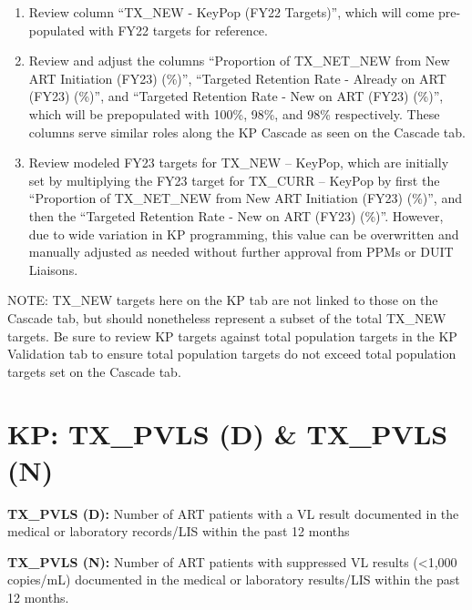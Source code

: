 \documentclass[
  openany]{book}
\begin{document}
\begin{enumerate}
\def\labelenumi{\arabic{enumi}.}
\item
  Review column ``TX\_NEW - KeyPop (FY22 Targets)'', which will come
  pre-populated with FY22 targets for reference.
\item
  Review and adjust the columns ``Proportion of TX\_NET\_NEW from New ART
  Initiation (FY23) (\%)'', ``Targeted Retention Rate - Already on ART
  (FY23) (\%)'', and ``Targeted Retention Rate - New on ART (FY23) (\%)'',
  which will be prepopulated with 100\%, 98\%, and 98\% respectively.
  These columns serve similar roles along the KP Cascade as seen on
  the Cascade tab.
\item
  Review modeled FY23 targets for TX\_NEW -- KeyPop, which are
  initially set by multiplying the FY23 target for TX\_CURR -- KeyPop
  by first the ``Proportion of TX\_NET\_NEW from New ART Initiation
  (FY23) (\%)'', and then the ``Targeted Retention Rate - New on ART
  (FY23) (\%)''. However, due to wide variation in KP programming, this
  value can be overwritten and manually adjusted as needed without
  further approval from PPMs or DUIT Liaisons.
\end{enumerate}

NOTE: TX\_NEW targets here on the KP tab are not linked to those on the
Cascade tab, but should nonetheless represent a subset of the total
TX\_NEW targets. Be sure to review KP targets against total population
targets in the KP Validation tab to ensure total population targets do
not exceed total population targets set on the Cascade tab.\textbf{\hfill\break
}

\hypertarget{kp-tx_pvls-d-tx_pvls-n}{%
\section{KP: TX\_PVLS (D) \& TX\_PVLS (N)}\label{kp-tx_pvls-d-tx_pvls-n}}

\textbf{TX\_PVLS (D):} Number of ART patients with a VL result documented in
the medical or laboratory records/LIS within the past 12 months

\textbf{TX\_PVLS (N):} Number of ART patients with suppressed VL results
(\textless1,000 copies/mL) documented in the medical or laboratory results/LIS
within the past 12 months.
\end{document}
